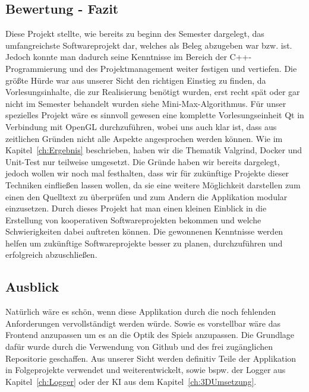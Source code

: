 \documentclass[a4paper]{scrartcl}
\begin{document}
\subsection{Bewertung - Fazit}\label{ch:Bewertung}
Diese Projekt stellte, wie bereits zu beginn des Semester dargelegt, das umfangreichste Softwareprojekt dar, welches als Beleg abzugeben war bzw. ist. Jedoch konnte man dadurch seine Kenntnisse im Bereich der C++-Programmierung und des Projektmanagement weiter festigen und vertiefen. Die größte Hürde war aus unserer Sicht den richtigen Einstieg zu finden, da Vorlesungsinhalte, die zur Realisierung benötigt wurden, erst recht spät oder gar nicht im Semester behandelt wurden siehe Mini-Max-Algorithmus. Für unser spezielles Projekt wäre es sinnvoll gewesen eine komplette Vorlesungseinheit Qt in Verbindung mit OpenGL durchzuführen, wobei uns auch klar ist, dass aus zeitlichen Gründen nicht alle Aspekte angesprochen werden können. Wie im Kapitel~\ref{ch:Ergebnis} beschrieben, haben wir die Thematik Valgrind, Docker und Unit-Test nur teilweise umgesetzt. Die Gründe haben wir bereits dargelegt, jedoch wollen wir noch mal festhalten, dass wir für zukünftige Projekte dieser Techniken einfließen lassen wollen, da sie eine weitere Möglichkeit darstellen zum einen den Quelltext zu überprüfen und zum Andern die Applikation modular einzusetzen. Durch dieses Projekt hat man einen kleinen Einblick in die Erstellung von kooperativen Softwareprojekten bekommen und welche Schwierigkeiten dabei auftreten können. Die gewonnenen Kenntnisse werden helfen um zukünftige Softwareprojekte besser zu planen, durchzuführen und erfolgreich abzuschließen. 

\subsection{Ausblick}\label{ch:Ausblick}
Natürlich wäre es schön, wenn diese Applikation durch die noch fehlenden Anforderungen vervollständigt werden würde. Sowie es vorstellbar wäre das Frontend anzupassen um es an die Optik des Spiels anzupassen. Die Grundlage dafür wurde durch die Verwendung von Github und des frei zugänglichen Repositorie\cite{GitRepo16} geschaffen. Aus unserer Sicht werden definitiv Teile der Applikation in Folgeprojekte verwendet und weiterentwickelt, sowie bspw. der Logger aus Kapitel~\ref{ch:Logger} oder der KI aus dem Kapitel~\ref{ch:3DUmsetzung}.

\newpage

% 
%
%
\printbibliography 
\end{document}
